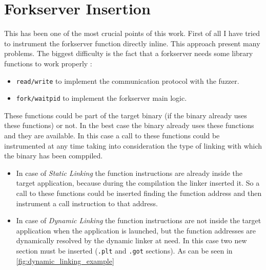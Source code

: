 \section{Forkserver Insertion}\label{sec:forkserver_insertion}
    This has been one of the most crucial points of this work.
    First of all I have tried to instrument the forkserver function directly inline.
    This approach present many problems. The biggest difficulty is the fact that a forkserver needs some library functions 
    to work properly :
    \begin{itemize}
        \item \texttt{read/write} to implement the communication protocol with the fuzzer.
        \item \texttt{fork/waitpid} to implement the forkserver main logic.
    \end{itemize}
    These functions could be part of the target binary (if the binary already uses these functions) or not.
    In the best case the binary already uses these functions and they are available. 
    In this case a call to these functions could be instrumented at any time taking into consideration the type of 
    linking with which the binary has been comppiled.
    \begin{itemize}
        \item In case of \textit{Static Linking} the function instructions are already inside the target application, 
            because during the compilation the linker inserted it. So a call to these functions could be inserted finding 
            the function address and then instrument a call instruction to that address.
        \item In case of \textit{Dynamic Linking} the function instructions are not inside the target application when 
            the application is launched, but the function addresses are dynamically resolved by the dynamic linker at need. 
            In this case two new section must be inserted (\texttt{.plt} and \texttt{.got} sections).
            As can be seen in \cref{fig:dynamic_linking_example} 
    \end{itemize}

